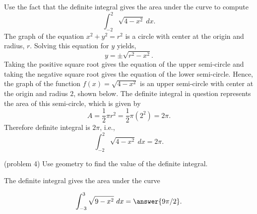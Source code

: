 \documentclass{ximera}
\begin{document}
\begin{example}[example 4]
Use the fact that the definite integral gives the area under the curve to compute
\[\int_{-2}^2 \sqrt{4-x^2} \ dx.\]
The graph of the equation $x^2 + y^2 = r^2$ is a circle with center at the origin and radius, $r$.
Solving this equation for $y$ yields,
\[
y = \pm \sqrt{r^2 - x^2}.
\]
Taking the positive square root gives the equation of the upper semi-circle and taking the negative square root gives 
the equation of the lower semi-circle.
Hence, the graph of the function $f(x) = \sqrt{4-x^2}$ is an upper semi-circle with center at the origin and radius $2$, shown below. 
The definite integral in question represents the area of this semi-circle, which is given by
\[
A = \frac12 \pi r^2 = \frac12 \pi (2^2) = 2\pi.
\]
Therefore definite integral is $2\pi$, i.e.,
\[\int_{-2}^2 \sqrt{4-x^2} \ dx =2\pi.\]



\begin{image}
\end{image}

\end{example}

\begin{problem}(problem 4)
Use geometry to find the value of the definite integral.
\begin{hint}
The definite integral gives the area under the curve
\end{hint}
\[\int_{-3}^{3} \sqrt{9-x^2} \ dx = \answer{9\pi/2}.\]
\end{problem}
\end{document}
